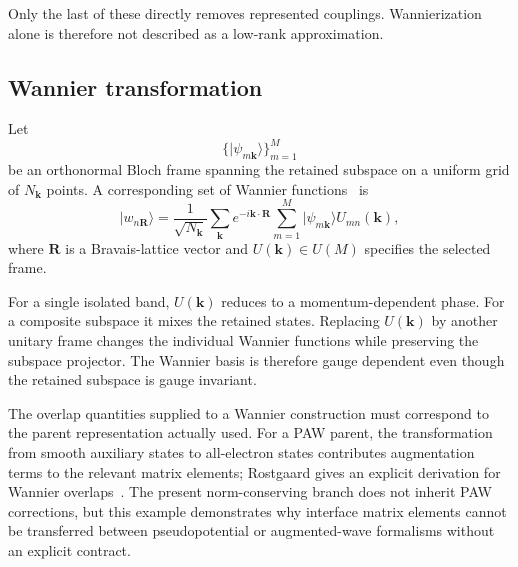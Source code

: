 Only the last of these directly removes represented couplings. Wannierization
alone is therefore not described as a low-rank approximation.

\subsection{Wannier transformation}


Let
\begin{equation}
  \{\lvert\psi_{m\mathbf k}\rangle\}_{m=1}^{M}
\end{equation}
be an orthonormal Bloch frame spanning the retained subspace on a uniform grid
of $N_{\mathbf k}$ points. A corresponding set of Wannier
functions~\cite{wannier1937} is
\begin{equation}
  \lvert w_{n\mathbf R}\rangle
  =
  \frac{1}{\sqrt{N_{\mathbf k}}}
  \sum_{\mathbf k}e^{-i\mathbf k\cdot\mathbf R}
  \sum_{m=1}^{M}
  \lvert\psi_{m\mathbf k}\rangle U_{mn}(\mathbf k),
\end{equation}
where $\mathbf R$ is a Bravais-lattice vector and
$U(\mathbf k)\in U(M)$ specifies the selected frame.

For a single isolated band, $U(\mathbf k)$ reduces to a momentum-dependent
phase. For a composite subspace it mixes the retained states. Replacing
$U(\mathbf k)$ by another unitary frame changes the individual Wannier
functions while preserving the subspace projector. The Wannier basis is
therefore gauge dependent even though the retained subspace is gauge invariant.


The overlap quantities supplied to a Wannier construction must correspond to
the parent representation actually used. For a PAW parent, the transformation
from smooth auxiliary states to all-electron states contributes augmentation
terms to the relevant matrix elements; Rostgaard gives an explicit derivation
for Wannier overlaps~\cite{rostgaard2009}. The present norm-conserving branch
does not inherit PAW corrections, but this example demonstrates why interface
matrix elements cannot be transferred between pseudopotential or augmented-wave
formalisms without an explicit contract.

